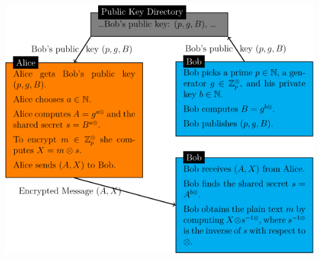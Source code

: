\documentclass[12pt,a4paper]{article}
\begin{document}
\includegraphics[width=15cm, height=12cm]{images/elgamal.png}
\end{document}
